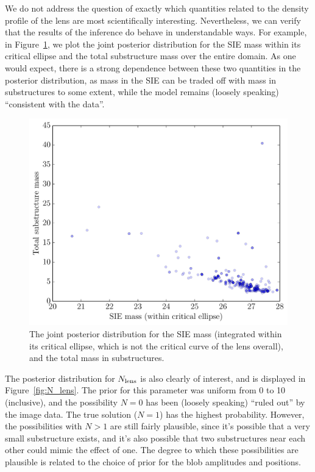 \documentclass[useAMS,usenatbib]{mn2e}
\begin{document}
We do not address the question of exactly which quantities related to the
density profile of the lens are most scientifically interesting. Nevertheless,
we can verify that the results of the inference do behave in understandable
ways. For example, in Figure~\ref{fig:simdata_masses},
we plot the joint posterior distribution
for the SIE mass within its critical ellipse and the total substructure mass
over the entire domain. As one would expect, there is a strong dependence
between these two quantities in the posterior distribution, as mass in the
SIE can be traded off with mass in substructures to some extent, while
the model remains (loosely speaking) ``consistent with the data''.
\begin{figure}
\begin{center}
\includegraphics[scale=0.4]{simdata_masses.pdf}
\caption{The joint posterior distribution for the SIE mass (integrated within
its critical ellipse, which is not the critical curve of the lens overall),
and the total mass in substructures.\label{fig:simdata_masses}}
\end{center}
\end{figure}

The posterior distribution for $N_{\rm lens}$ is also clearly of interest, and
is displayed in Figure~\ref{fig:N_lens}. The prior for this parameter was
uniform from 0 to 10 (inclusive), and the possibility $N=0$ has been
(loosely speaking) ``ruled out'' by the image data. The true solution ($N=1$)
has the highest probability. However, the possibilities with $N > 1$ are
still fairly plausible, since it's possible that a very small substructure
exists, and it's also possible that two substructures near each other could
mimic the effect of one. The degree to which these possibilities are plausible
is related to the choice of prior for the blob amplitudes and positions.
\end{document}

